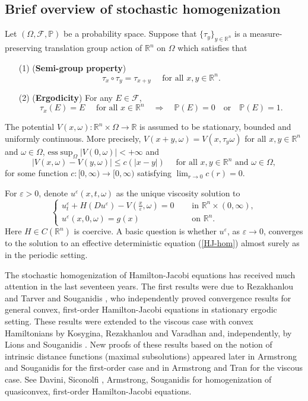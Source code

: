 \documentclass[12pt,reqno]{amsart}
\theoremstyle{plain}
\theoremstyle{remark}
\numberwithin{equation}{section}
\newcommand{\bP}{\mathbb{P}}
\newcommand{\R}{\mathbb{R}}
\newcommand{\cF}{\mathcal{F}}
\newcommand{\ep}{\varepsilon}
\newcommand{\om}{\omega}
\newcommand{\Om}{\Omega}
\begin{document}
\subsection{Brief overview of stochastic homogenization}
 Let $(\Om, \cF, \bP)$ be a probability space.   
 Suppose that $\{\tau_y\}_{y\in \R^n}$ is a  measure-preserving translation group action of $\R^n$ on $\Om$ which satisfies that 
\begin{itemize}
\item[(1)] ({\bf Semi-group property})
$$
\tau_x\circ \tau_y=\tau_{x+y} \quad \text{ for all } x,y\in \R^n.
$$
\item[(2)] ({\bf Ergodicity}) For any $E\in \cF$, 
$$
\tau_x(E)=E \quad   \text{ for all } x\in \R^n  \quad \Rightarrow  \quad \bP(E)=0 \quad \mathrm{or} \quad \bP(E)=1.
$$
\end{itemize}
The potential $V(x, \omega):\R^n\times \Om \to \R$ is assumed to be stationary,  bounded and uniformly continuous.
More precisely, $V(x+y,\omega)=V(x, \tau_y \omega)$ for all $x,y \in \R^n$ and $\om \in \Om$,  
$\text{ess} \sup_{\Om}|V(0,\omega)|<+\infty$ and
$$
|V(x,\omega)-V(y,\omega)|\leq c(|x-y|) \quad \text{ for all $x,y \in \R^n$ and $\om \in \Om$},
$$
for  some function $c:[0, \infty)\to  [0, \infty)$ satisfying $\lim_{r\to 0}c(r)=0$. 

For $\ep>0$, denote $u^{\ep}(x,t, \omega)$ as the unique viscosity solution to 
\begin{equation}\label{RamHJ-eq}
\begin{cases}
u^\ep_t + H(Du^\ep) - V\left(\frac{x}{\ep}, \omega\right)=0 \quad &\text{ in } \R^n \times (0,\infty),\\
u^\ep(x,0, \omega)=g(x) \quad &\text{ on } \R^n.
\end{cases}
\end{equation}
Here $H\in C(\R^n)$ is coercive.  A basic question is whether $u^{\ep}$, as $\ep \to 0$,  converges to the solution to an effective deterministic equation (\ref{HJ-hom}) almost surely as in the periodic setting. 


The stochastic homogenization of Hamilton-Jacobi equations   has received much attention in the last seventeen years. 
The first  results were due to Rezakhanlou and Tarver \cite{ReTa} and Souganidis \cite{Sou}, 
who independently proved convergence results for general convex, first-order Hamilton-Jacobi equations in stationary ergodic setting. 
These results were extended to the viscous case with convex Hamiltonians by Kosygina, Rezakhanlou and Varadhan \cite{KRV} and, independently, 
by Lions and Souganidis \cite{LiS1}. 
New proofs of these results based on the notion of intrinsic distance functions (maximal subsolutions) 
appeared later in Armstrong and Souganidis \cite{AS3} for the first-order case 
and in Armstrong and Tran \cite{AT1} for the viscous case.
See Davini, Siconolfi \cite{DaSi}, Armstrong, Souganidis \cite{AS3} for homogenization of quasiconvex, first-order Hamilton-Jacobi equations.
\smallskip
\end{document}
